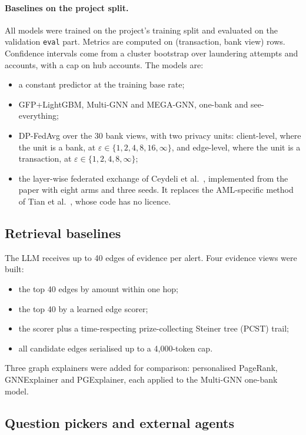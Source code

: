 \documentclass[11pt,a4paper]{article}
\newcommand{\eps}{\varepsilon}
\begin{document}
\paragraph{Baselines on the project split.} All models were trained on the project's training split and evaluated on the validation \texttt{eval} part. Metrics are computed on (transaction, bank view) rows. Confidence intervals come from a cluster bootstrap over laundering attempts and accounts, with a cap on hub accounts. The models are:
\begin{itemize}
\item a constant predictor at the training base rate;
\item GFP+LightGBM, Multi-GNN and MEGA-GNN, one-bank and see-everything;
\item DP-FedAvg \cite{mcmahan2018} over the 30 bank views, with two privacy units: client-level, where the unit is a bank, at $\eps \in \{1,2,4,8,16,\infty\}$, and edge-level, where the unit is a transaction, at $\eps \in \{1,2,4,8,\infty\}$;
\item the layer-wise federated exchange of Ceydeli et al.\ \cite{ceydeli2026}, implemented from the paper with eight arms and three seeds. It replaces the AML-specific method of Tian et al.\ \cite{tian2025}, whose code has no licence.
\end{itemize}

\subsection{Retrieval baselines}

The LLM receives up to 40 edges of evidence per alert. Four evidence views were built:
\begin{itemize}
\item the top 40 edges by amount within one hop;
\item the top 40 by a learned edge scorer;
\item the scorer plus a time-respecting prize-collecting Steiner tree (PCST) trail;
\item all candidate edges serialised up to a 4,000-token cap.
\end{itemize}
Three graph explainers were added for comparison: personalised PageRank, GNNExplainer and PGExplainer, each applied to the Multi-GNN one-bank model.

\subsection{Question pickers and external agents}
\end{document}
